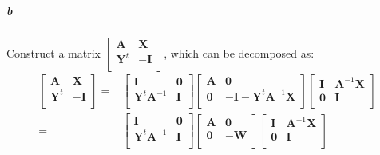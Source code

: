 \documentclass[22pt]{article}
\begin{document}
	\subparagraph{b} Construct a matrix $\left[ \begin{array}{cc}
			 \mathbf{A} & \mathbf{X} \\
			 \mathbf{Y}^t & \mathbf{-I} \\
			 \end{array} \right]$, which can be decomposed as:
	\begin{align}
		\left[ \begin{array}{cc}
			 \mathbf{A} & \mathbf{X} \\
			 \mathbf{Y}^t & -\mathbf{I} \\
			 \end{array} \right] = & \left[ \begin{array}{cc}
			 \mathbf{I} & \mathbf{0} \\
			 \mathbf{Y}^t\mathbf{A}^{-1} & \mathbf{I} \\
			 \end{array} \right]  \left[ \begin{array}{cc}
			 \mathbf{A} & \mathbf{0} \\
			 \mathbf{0} & -\mathbf{I} - \mathbf{Y}^t\mathbf{A}^{-1}\mathbf{X} \\
			 \end{array} \right]\left[ \begin{array}{cc}
			 \mathbf{I} & \mathbf{A}^{-1}\mathbf{X} \\
			 \mathbf{0} & \mathbf{I} \\
			 \end{array} \right] \\
			 = &\left[ \begin{array}{cc}
			 \mathbf{I} & \mathbf{0} \\
			 \mathbf{Y}^t\mathbf{A}^{-1} & \mathbf{I} \\
			 \end{array} \right]  \left[ \begin{array}{cc}
			 \mathbf{A} & \mathbf{0} \\
			 \mathbf{0} & -\mathbf{W}  \\
			 \end{array} \right]\left[ \begin{array}{cc}
			 \mathbf{I} & \mathbf{A}^{-1}\mathbf{X} \\
			 \mathbf{0} & \mathbf{I} \\
			 \end{array} \right] 
	\end{align}
\end{document}
